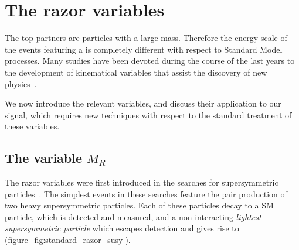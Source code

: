 \chapter{The razor variables}
The top partners are particles with a large mass. Therefore the energy scale
of the events featuring a \TP is completely different with respect to
Standard Model processes. Many studies have been devoted during the course
of the last years to the development of kinematical variables that assist
the discovery of new physics~\cite{rogan_variables}.

We now introduce the relevant variables, and discuss their application to
our signal, which requires new techniques with respect to the standard
treatment of these variables.

\section{The variable $M_R$}\label{sec:mr}
The razor variables were first introduced in the searches for supersymmetric
particles~\cite{supersimmetry_razor}. The simplest events in these searches
feature the pair production of two heavy supersymmetric particles. Each of
these particles decay to a SM particle, which is detected and measured, and
a non-interacting \emph{lightest supersymmetric particle} which escapes
detection and gives rise to \met (figure~\ref{fig:standard_razor_susy}).

